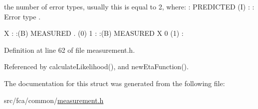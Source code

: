 the number of error types, usually this is equal to 2, where\-: \-: \-P\-R\-E\-D\-I\-C\-T\-E\-D (\-I) \-: \-: \-Error type . 

\-X \-: \-:(\-B) \-M\-E\-A\-S\-U\-R\-E\-D . (0) 1 \-: \-:(\-B) \-M\-E\-A\-S\-U\-R\-E\-D \-X 0 (1) \-: 

\-Definition at line 62 of file measurement.\-h.



\-Referenced by calculate\-Likelihood(), and new\-Eta\-Function().



\-The documentation for this struct was generated from the following file\-:\begin{DoxyCompactItemize}
\item 
src/fca/common/\hyperlink{common_2measurement_8h}{measurement.\-h}\end{DoxyCompactItemize}
